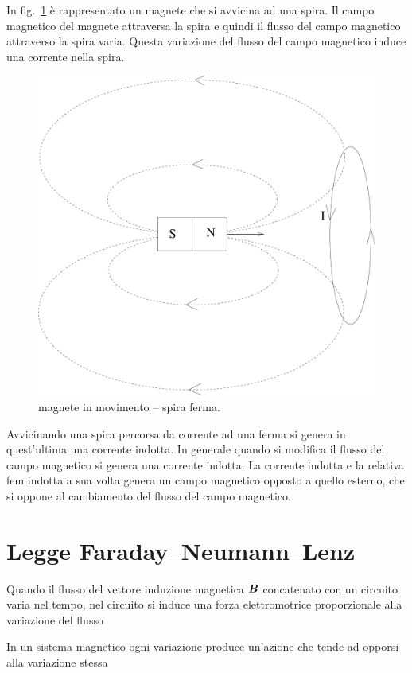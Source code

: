 In fig.~\ref{magnete_spira} è rappresentato un magnete che si avvicina ad una spira. Il campo magnetico del magnete attraversa la spira e quindi il flusso del campo magnetico attraverso la spira varia. Questa variazione del flusso del campo magnetico induce una corrente nella spira.
\begin{figure}[htbp]
  \centering
  \includegraphics[scale=0.25]{immagini/fisica2/ind_spira01}
  \caption{magnete in movimento -- spira ferma.}
  \label{magnete_spira}
\end{figure}
Avvicinando una spira percorsa da corrente ad una ferma si genera in quest'ultima una corrente indotta. In generale quando si modifica il flusso del campo magnetico si genera una corrente indotta. La corrente indotta e la relativa fem indotta a sua volta genera un campo magnetico opposto a quello esterno, che si oppone al cambiamento del flusso del campo magnetico.
\section{Legge Faraday--Neumann--Lenz}
\begin{legge}
  Quando il flusso del vettore induzione magnetica $\boldsymbol{B}$ concatenato con un circuito varia nel tempo, nel circuito si induce una forza elettromotrice proporzionale alla variazione del flusso
\end{legge}
\begin{legge}[Lenz]
  In un sistema magnetico ogni variazione produce un'azione che tende ad opporsi alla variazione stessa
\end{legge}

